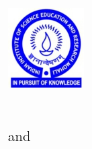 \begin{titlepage}
	\begin{addmargin}[-1cm]{-3cm}
    \begin{center}
        \large  

        \hfill

        \vfill

        \begingroup
            \color{Maroon}\spacedallcaps{\myTitle} \\ \bigskip
        \endgroup

        \spacedlowsmallcaps{\myName}

        \vfill

        \includegraphics[width=2cm]{gfx/iiserlogo} \\ \medskip

        \mySubtitle \\ \medskip   
        \myProf and \myOtherProf \\
        \myUni \\ \bigskip

        \myTime\

        \vfill                      

    \end{center}  
  \end{addmargin}       
\end{titlepage}   